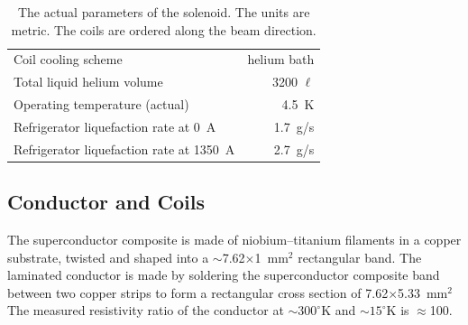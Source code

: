 \begin{table}[h]
\begin{center}
\begin{tabular}{lr}
       Coil cooling scheme             & helium bath \\   
       Total liquid helium volume      & 3200 $\ell$ \\
       Operating temperature (actual)  &  4.5~K \\   
       Refrigerator liquefaction rate at 0~A        & 1.7~g/s    \\
       Refrigerator liquefaction rate at 1350~A     & 2.7~g/s    \\
     \hline
   \end{tabular}
   \normalsize
 \end{center}
  \caption{
    The actual parameters of the solenoid.  The units are metric. The
    coils are ordered along the beam direction.
    \label{tab:sol:summary}
  }
\end{table}


\subsection[Conductor and Coils]{Conductor and Coils
 \label{sec:sol:coils}
}

The superconductor composite is made of niobium--titanium filaments
in a copper substrate, twisted and shaped into a
$\sim$7.62$\times$1~mm$^2$ rectangular band. The laminated conductor
is made by soldering the superconductor composite band between two
copper strips
to form a rectangular cross section of 7.62$\times$5.33~mm$^2$
The measured resistivity ratio of the conductor at $\sim{}300^\circ{}$K and
$\sim{}15^\circ{}$K is $\approx{}$100.  


